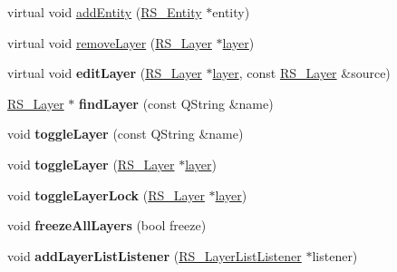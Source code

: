 \begin{DoxyCompactItemize}
\item 
virtual void \hyperlink{classRS__Graphic_af1b73c73b2acbb8e53b138584bfb5965}{add\-Entity} (\hyperlink{classRS__Entity}{R\-S\-\_\-\-Entity} $\ast$entity)
\item 
virtual void \hyperlink{classRS__Graphic_a54354821e11f240ceac751a23aacd177}{remove\-Layer} (\hyperlink{classRS__Layer}{R\-S\-\_\-\-Layer} $\ast$\hyperlink{classRS__Entity_a6e738a0a081f97b9923787777e639b27}{layer})
\item 
\hypertarget{classRS__Graphic_a68bdaed19adf5c65110608ca8910c7c7}{virtual void {\bfseries edit\-Layer} (\hyperlink{classRS__Layer}{R\-S\-\_\-\-Layer} $\ast$\hyperlink{classRS__Entity_a6e738a0a081f97b9923787777e639b27}{layer}, const \hyperlink{classRS__Layer}{R\-S\-\_\-\-Layer} \&source)}\label{classRS__Graphic_a68bdaed19adf5c65110608ca8910c7c7}

\item 
\hypertarget{classRS__Graphic_aa39ac7f018eb84e7b47e5f597498b58f}{\hyperlink{classRS__Layer}{R\-S\-\_\-\-Layer} $\ast$ {\bfseries find\-Layer} (const Q\-String \&name)}\label{classRS__Graphic_aa39ac7f018eb84e7b47e5f597498b58f}

\item 
\hypertarget{classRS__Graphic_aec533c0a40a3cea40b5180ad6249ff27}{void {\bfseries toggle\-Layer} (const Q\-String \&name)}\label{classRS__Graphic_aec533c0a40a3cea40b5180ad6249ff27}

\item 
\hypertarget{classRS__Graphic_a4205ef7c3e7633f4f1babc7c6c184cb1}{void {\bfseries toggle\-Layer} (\hyperlink{classRS__Layer}{R\-S\-\_\-\-Layer} $\ast$\hyperlink{classRS__Entity_a6e738a0a081f97b9923787777e639b27}{layer})}\label{classRS__Graphic_a4205ef7c3e7633f4f1babc7c6c184cb1}

\item 
\hypertarget{classRS__Graphic_ab0d847b430d3f7958779cebe334293bd}{void {\bfseries toggle\-Layer\-Lock} (\hyperlink{classRS__Layer}{R\-S\-\_\-\-Layer} $\ast$\hyperlink{classRS__Entity_a6e738a0a081f97b9923787777e639b27}{layer})}\label{classRS__Graphic_ab0d847b430d3f7958779cebe334293bd}

\item 
\hypertarget{classRS__Graphic_a847e520af96c2e87cd64636e83dd5623}{void {\bfseries freeze\-All\-Layers} (bool freeze)}\label{classRS__Graphic_a847e520af96c2e87cd64636e83dd5623}

\item 
\hypertarget{classRS__Graphic_a71eb3c3f0171053709b9d368cbe01ac8}{void {\bfseries add\-Layer\-List\-Listener} (\hyperlink{classRS__LayerListListener}{R\-S\-\_\-\-Layer\-List\-Listener} $\ast$listener)}\label{classRS__Graphic_a71eb3c3f0171053709b9d368cbe01ac8}


\end{DoxyCompactItemize}
